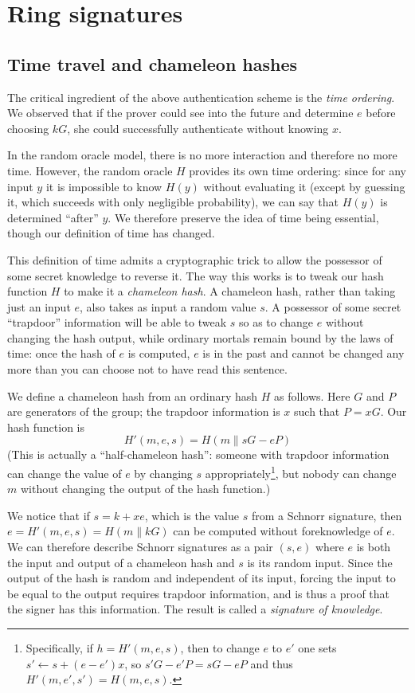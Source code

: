 \documentclass[letterpaper]{article}
\begin{document}
\section{Ring signatures}

\subsection{Time travel and chameleon hashes}

The critical ingredient of the above authentication scheme is the \emph{time
ordering}. We observed that if the prover could see into the future and
determine $e$ before choosing $kG$, she could successfully authenticate
without knowing $x$.

In the random oracle model, there is no more interaction and therefore no
more time. However, the random oracle $H$ provides its own time ordering:
since for any input $y$ it is impossible to know $H(y)$ without evaluating
it (except by guessing it, which succeeds with only negligible probability),
we can say that $H(y)$ is determined ``after'' $y$. We therefore preserve
the idea of time being essential, though our definition of time has changed.

This definition of time admits a cryptographic trick to allow the possessor
of some secret knowledge to reverse it. The way this works is to tweak our
hash function $H$ to make it a \emph{chameleon hash}\cite{krawczyk+rabin1997}. A chameleon hash,
rather than taking just an input $e$, also takes as input a random value $s$.
A possessor of some secret ``trapdoor'' information
will be able to tweak $s$ so as to change $e$ without changing the hash output,
while ordinary mortals remain bound by the laws of time: once the hash of
$e$ is computed, $e$ is in the past and cannot be changed any more than
you can choose not to have read this sentence.

We define a chameleon hash from an ordinary hash $H$ as follows. Here
$G$ and $P$ are generators of the group; the trapdoor information is
$x$ such that $P = xG$. Our hash function is
\[ H'(m, e, s) = H(m\|sG - eP) \]
(This is actually a ``half-chameleon hash'': someone with trapdoor information
can change the value of $e$ by changing $s$ appropriately\footnote{Specifically,
if $h = H'(m, e, s)$, then to change $e$ to $e'$ one sets $s'\gets s +
(e - e')x$, so $s'G - e'P = sG - eP$ and thus $H'(m, e', s') = H(m,e,s)$.},
but nobody can change $m$ without changing the output of the hash function.)

We notice that if $s = k + xe$, which is the value $s$ from a Schnorr signature,
then $e = H'(m, e, s) = H(m\|kG)$ can be computed without foreknowledge of $e$.
We can therefore describe Schnorr signatures as a pair $(s, e)$ where $e$ is
both the input and output of a chameleon hash and $s$ is its random input.
Since the output of the hash is random and independent of its input, forcing
the input to be equal to the output requires trapdoor information, and is thus a
proof that the signer has this information.
The result is called a \emph{signature of knowledge}.
\end{document}
